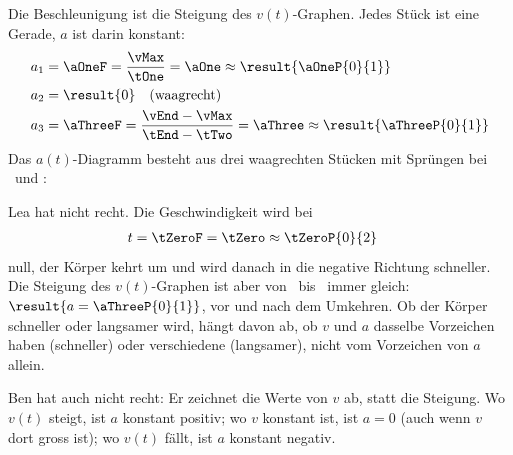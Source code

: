 \begin{abcliste}
\abc Die Beschleunigung ist die Steigung des $v(t)$-Graphen. Jedes Stück ist eine Gerade, $a$ ist darin konstant:
\begin{align}
 a_1 &= \aOneF = \frac{\vMax}{\tOne} = \aOne \approx \result{\aOneP{0}{1}} \\
 a_2 &= \result{0} \quad \text{(waagrecht)} \\
 a_3 &= \aThreeF = \frac{\vEnd-\vMax}{\tEnd-\tTwo} = \aThree \approx \result{\aThreeP{0}{1}}
\end{align}
Das $a(t)$-Diagramm besteht aus drei waagrechten Stücken mit Sprüngen bei \tOneO\ und \tTwoO:
\begin{center}
\end{center}
\abc Lea hat nicht recht. Die Geschwindigkeit wird bei
\begin{align}
 t &= \tZeroF = \tZero \approx \tZeroP{0}{2}
\end{align}
null, der Körper kehrt um und wird danach in die negative Richtung schneller. Die Steigung des $v(t)$-Graphen ist aber von \tTwoO\ bis \tEndO\ immer gleich: $\result{a = \aThreeP{0}{1}}$, vor und nach dem Umkehren. Ob der Körper schneller oder langsamer wird, hängt davon ab, ob $v$ und $a$ dasselbe Vorzeichen haben (schneller) oder verschiedene (langsamer), nicht vom Vorzeichen von $a$ allein.

Ben hat auch nicht recht: Er zeichnet die Werte von $v$ ab, statt die Steigung. Wo $v(t)$ steigt, ist $a$ konstant positiv; wo $v$ konstant ist, ist $a = 0$ (auch wenn $v$ dort gross ist); wo $v(t)$ fällt, ist $a$ konstant negativ.
\end{abcliste}
